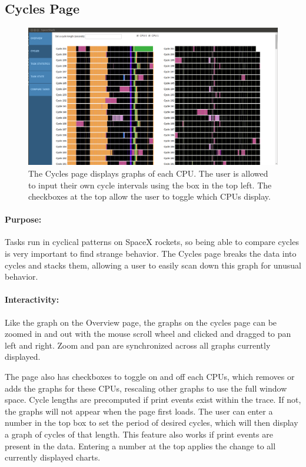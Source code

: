 \documentclass{hmcclinic}
\begin{document}
  \subsection{Cycles Page} %

  \begin{figure}[H]
  \centering
      \includegraphics[width=5in]{cycles-page.png}
  \caption{The Cycles page displays graphs of each CPU. The user is allowed to
  input their own cycle intervals using the box in the top left. The checkboxes
at the top allow the user to toggle which CPUs display.}
  \end{figure}
  
  \paragraph{Purpose:}Tasks run in cyclical patterns on SpaceX rockets, so being able to compare
   cycles is very important to find strange behavior. The Cycles page
  breaks the data into cycles and stacks them, allowing a user to easily scan
  down this graph for unusual behavior.

\paragraph{Interactivity:}    
    Like the graph on the Overview page, the graphs on the cycles page can be
    zoomed in and out with the mouse scroll wheel and clicked and dragged to pan
    left and right. Zoom and pan are synchronized across all graphs currently
    displayed.

    The page also has checkboxes to toggle on and off each CPUs, which removes
    or adds the graphs for these CPUs, rescaling other graphs to use the full window
    space. Cycle lengths are precomputed if print events exist within the trace. If
    not, the graphs will not appear when the page first loads. The user can enter a
    number in the top box to set the period of desired cycles, which will then
    display a graph of cycles of that length. This feature also works  if
    print events are present in the data. Entering a number at the top applies
    the change to all currently displayed charts.
        
\end{document}
